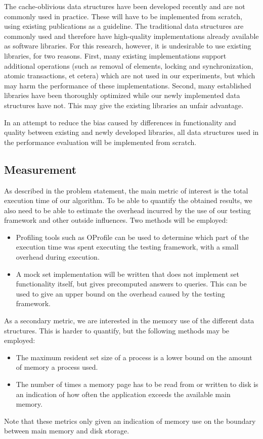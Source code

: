\documentclass{acm_proc_article-sp}
\begin{document}
The cache-oblivious data structures have been developed recently and are not commonly used in practice. These will have to be implemented from scratch, using existing publications as a guideline. The traditional data structures are commonly used and therefore have high-quality implementations already available as software libraries. For this research, however, it is undesirable to use existing libraries, for two reasons. First, many existing implementations support additional operations (such as removal of elements, locking and synchronization, atomic transactions, et cetera) which are not used in our experiments, but which may harm the performance of these implementations. Second, many established libraries have been thoroughly optimized while our newly implemented data structures have not. This may give the existing libraries an unfair advantage.

In an attempt to reduce the bias caused by differences in functionality and quality between existing and newly developed libraries, all data structures used in the performance evaluation will be implemented from scratch.

\subsection{Measurement}
As described in the problem statement, the main metric of interest is the total execution time of our algorithm. To be able to quantify the obtained results, we also need to be able to estimate the overhead incurred by the use of our testing framework and other outside influences. Two methods will be employed:
\begin{itemize}
\item Profiling tools such as OProfile \cite{oprofile} can be used to determine which part of the execution time was spent executing the testing framework, with a small overhead during execution.
\item A mock set implementation will be written that does not implement set functionality itself, but gives precomputed answers to queries. This can be used to give an upper bound on the overhead caused by the testing framework.
\end{itemize}

As a secondary metric, we are interested in the memory use of the different data structures. This is harder to quantify, but the following methods may be employed:
\begin{itemize}
\item The maximum resident set size of a process is a lower bound on the amount of memory a process used.
\item The number of times a memory page has to be read from or written to disk is an indication of how often the application exceeds the available main memory.
\end{itemize}
Note that these metrics only given an indication of memory use on the boundary between main memory and disk storage.
\end{document}
